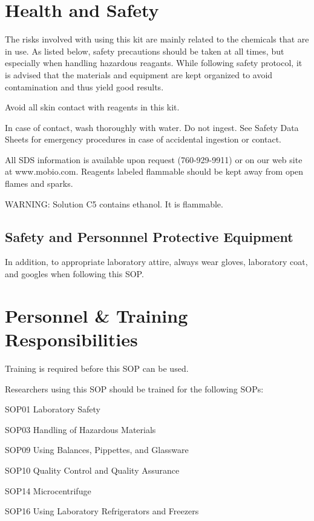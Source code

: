 \documentclass[12pt]{../SOP3_alpha}
\begin{document}
\section{Health and Safety}

\NP The risks involved with using this kit are mainly related to the chemicals that are in use. As listed below, safety precautions should be taken at all times, but especially when handling hazardous reagants. While following safety protocol, it is advised that the materials and equipment are kept organized to avoid contamination and thus yield good results. 

\NP Avoid all skin contact with reagents in this kit. 

\NP In case of contact, wash thoroughly with water. Do not
ingest. See Safety Data Sheets for emergency procedures in case
of accidental ingestion or contact. 

\NP All SDS information is available upon request (760-929-9911) or on our web site at www.mobio.com. Reagents labeled flammable should be kept away from open flames and sparks.

\NP WARNING: Solution C5 contains ethanol. It is flammable. 
 
\subsection {Safety and Personnnel Protective Equipment}

\NP In addition, to appropriate laboratory attire, always wear gloves, laboratory coat, and googles when following this SOP.

\section{Personnel \& Training Responsibilities}

\NP Training is required before this SOP can be used. 

\NP Researchers using this SOP should be trained for the following SOPs:

\begin{itemize*}
  \item SOP01 Laboratory Safety
  \item SOP03 Handling of Hazardous Materials
  \item SOP09 Using Balances, Pippettes, and Glassware
  \item SOP10 Quality Control and Quality Assurance
  \item SOP14 Microcentrifuge
  \item SOP16 Using Laboratory Refrigerators and Freezers
\end{itemize*}
\end{document}
